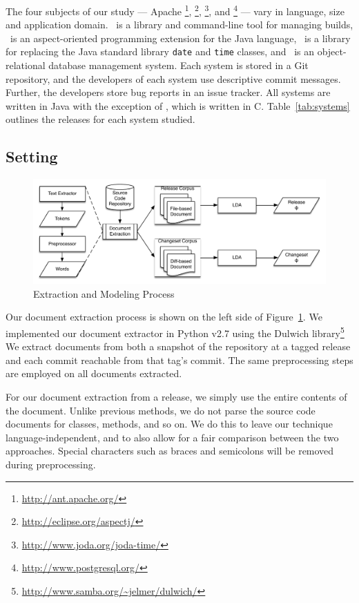 The four subjects of our study ---
Apache \ant\footnote{\url{http://ant.apache.org/}},
\aspectj\footnote{\url{http://eclipse.org/aspectj/}},
\jodatime\footnote{\url{http://www.joda.org/joda-time/}},
and \postgres\footnote{\url{http://www.postgresql.org/}}
--- vary in language, size and application domain.
\ant\ is a library and command-line tool for managing builds,
\aspectj\ is an aspect-oriented programming extension for the Java language,
\jodatime\ is a library for replacing the Java standard library \texttt{date} and \texttt{time} classes,
and \postgres\ is an object-relational database management system.
Each system is stored in a Git repository, and the developers of each system use descriptive commit messages.
Further, the developers store bug reports in an issue tracker.
All systems are written in Java with the exception of \postgres,
which is written in C. Table~\ref{tab:systems} outlines the releases for
each system studied.


\subsection{Setting}

\begin{figure}[!th]
    \centering
    \includegraphics[width=.75\textwidth]{changeset}
    \caption{Extraction and Modeling Process}
    \label{fig:process}
\end{figure}

Our document extraction process is shown on the left side of Figure~\ref{fig:process}.
We implemented our document extractor in Python v2.7
using the Dulwich library\footnote{\url{http://www.samba.org/~jelmer/dulwich/}} %
We extract documents from both a snapshot of the repository at a tagged
release and each commit reachable from that tag's commit.
The same preprocessing steps are employed on all documents extracted.

For our document extraction from a release,
we simply use the entire contents of the document.
Unlike previous methods, %
we do not parse the source code documents for classes, methods, and so on.
We do this to leave our technique language-independent,
and to also allow for a fair comparison between the two approaches.
Special characters such as braces and semicolons will be removed during
preprocessing.

